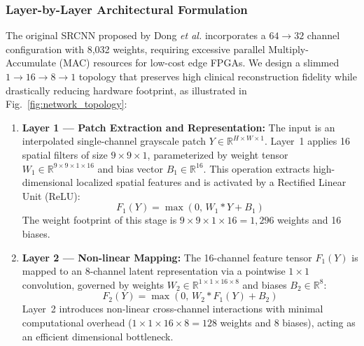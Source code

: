 \documentclass[conference]{IEEEtran}
\begin{document}
\subsubsection{Layer-by-Layer Architectural Formulation}
The original SRCNN proposed by Dong \textit{et al.} \cite{dong2014learning} incorporates a $64 \rightarrow 32$ channel configuration with 8,032 weights, requiring excessive parallel Multiply-Accumulate (MAC) resources for low-cost edge FPGAs. We design a slimmed $1 \rightarrow 16 \rightarrow 8 \rightarrow 1$ topology that preserves high clinical reconstruction fidelity while drastically reducing hardware footprint, as illustrated in Fig.~\ref{fig:network_topology}:
\begin{enumerate}
    \item \textbf{Layer 1 --- Patch Extraction and Representation:} The input is an interpolated single-channel grayscale patch $Y \in \mathbb{R}^{H \times W \times 1}$. Layer~1 applies 16 spatial filters of size $9 \times 9 \times 1$, parameterized by weight tensor $W_1 \in \mathbb{R}^{9 \times 9 \times 1 \times 16}$ and bias vector $B_1 \in \mathbb{R}^{16}$. This operation extracts high-dimensional localized spatial features and is activated by a Rectified Linear Unit (ReLU):
    \begin{equation}
    F_1(Y) = \max\left(0,\, W_1 * Y + B_1\right)
    \label{eq:layer1_conv}
    \end{equation}
    The weight footprint of this stage is $9 \times 9 \times 1 \times 16 = 1,296$ weights and 16 biases.
    
    \item \textbf{Layer 2 --- Non-linear Mapping:} The 16-channel feature tensor $F_1(Y)$ is mapped to an 8-channel latent representation via a pointwise $1 \times 1$ convolution, governed by weights $W_2 \in \mathbb{R}^{1 \times 1 \times 16 \times 8}$ and biases $B_2 \in \mathbb{R}^{8}$:
    \begin{equation}
    F_2(Y) = \max\left(0,\, W_2 * F_1(Y) + B_2\right)
    \label{eq:layer2_conv}
    \end{equation}
    Layer~2 introduces non-linear cross-channel interactions with minimal computational overhead ($1 \times 1 \times 16 \times 8 = 128$ weights and 8 biases), acting as an efficient dimensional bottleneck.
    

\end{enumerate}
\end{document}
